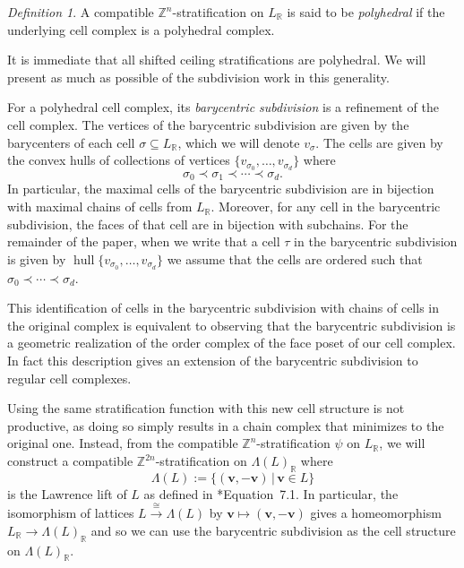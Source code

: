 \documentclass{amsart}
\newcommand{\ZZ}{\mathbb{Z}}
\newcommand{\RR}{\mathbb{R}}
\DeclareMathOperator{\hull}{hull}
\theoremstyle{remark}
\newtheorem{definition}[theorem]{Definition}
\begin{document}
\begin{definition}
  \label{def:polyhedral}
  A compatible $\ZZ^n$-stratification on $L_{\RR}$ is said to be \emph{polyhedral} if the underlying cell complex is a polyhedral complex.
\end{definition}

It is immediate that all shifted ceiling stratifications are polyhedral. We will present as much as possible of the subdivision work in this generality.

For a polyhedral cell complex, its \emph{barycentric subdivision} is a refinement of the cell complex. The vertices of the barycentric subdivision are given by the barycenters of each cell $\sigma\subseteq L_{\RR}$, which we will denote $v_{\sigma}$. The cells are given by the convex hulls of collections of vertices $\{v_{\sigma_0},\ldots,v_{\sigma_d}\}$ where 
\[\sigma_0\prec \sigma_1 \prec \cdots \prec \sigma_d.\]
In particular, the maximal cells of the barycentric subdivision are in bijection with maximal chains of cells from $L_{\RR}$.
Moreover, for any cell in the barycentric subdivision, the faces of that cell are in bijection with subchains.
For the remainder of the paper, when we write that a cell $\tau$ in the barycentric subdivision is given by $\hull\{v_{\sigma_0},\ldots,v_{\sigma_d}\}$
we assume that the cells are ordered such that $\sigma_0 \prec \cdots \prec \sigma_d$.

This identification of cells in the barycentric subdivision with chains of cells in the original complex
is equivalent to observing that the barycentric subdivision is a geometric realization of
the order complex of the face poset of our cell complex.
In fact this description gives an extension of the barycentric subdivision to regular cell complexes.

Using the same stratification function with this new cell structure is not productive, as doing so simply results in a chain complex that minimizes to the original one. Instead, from the compatible $\ZZ^n$-stratification $\psi$ on $L_{\RR}$, we will construct a compatible $\ZZ^{2n}$-stratification on $\Lambda(L)_{\RR}$ where \[\Lambda(L) := \{(\bm{v},-\bm{v}) \,|\, \bm{v}\in L\}\] is the Lawrence lift of $L$ as defined in \cite{SturmfelsGB}*{Equation~7.1}. In particular, the isomorphism of lattices $L\xrightarrow{\cong}\Lambda(L)$ by $\bm{v}\mapsto (\bm{v},-\bm{v})$ gives a homeomorphism $L_{\RR} \rightarrow \Lambda(L)_{\RR}$ and so we can use the barycentric subdivision as the cell structure on $\Lambda(L)_{\RR}$.
\end{document}

